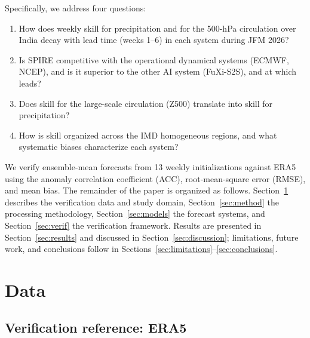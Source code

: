 \documentclass[11pt]{article}
\begin{document}
Specifically, we address four questions:
\begin{enumerate}
  \item How does weekly skill for precipitation and for the 500-hPa
        circulation over India decay with lead time (weeks 1--6) in
        each system during JFM 2026?
  \item Is SPIRE competitive with the operational dynamical systems
        (ECMWF, NCEP), and is it superior to the other AI system
        (FuXi-S2S), and at which leads?
  \item Does skill for the large-scale circulation (Z500) translate
        into skill for precipitation?
  \item How is skill organized across the IMD homogeneous regions, and
        what systematic biases characterize each system?
\end{enumerate}
We verify ensemble-mean forecasts from 13 weekly initializations
against ERA5 using the anomaly correlation coefficient (ACC),
root-mean-square error (RMSE), and mean bias. The remainder of the
paper is organized as follows. Section~\ref{sec:data} describes the
verification data and study domain, Section~\ref{sec:method} the
processing methodology, Section~\ref{sec:models} the forecast systems,
and Section~\ref{sec:verif} the verification framework. Results are
presented in Section~\ref{sec:results} and discussed in
Section~\ref{sec:discussion}; limitations, future work, and conclusions
follow in Sections~\ref{sec:limitations}--\ref{sec:conclusions}.

\section{Data}\label{sec:data}

\subsection{Verification reference: ERA5}\label{sec:era5}
\end{document}
